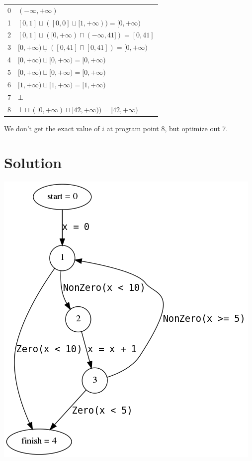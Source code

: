 \documentclass[a4paper]{article}
\def\lub{\sqcup}
\def\xlub{\underline\lub}
\def\glb{\sqcap}
\begin{document}
\begin{tabular}{|c|l|}
\hline
0 & $ (-\infty, +\infty) $                                                          \\
1 & $ [0, 1] \lub ([0, 0] \lub [1, +\infty)) = [0, +\infty) $                       \\
2 & $ [0, 1] \lub ([0, +\infty) \glb (-\infty, 41]) = [0, 41] $                     \\
3 & $ [0, +\infty) \xlub ([0, 41] \glb [0, 41]) = [0, +\infty) $                    \\
4 & $ [0, +\infty) \lub [0, +\infty) = [0, +\infty) $                               \\
5 & $ [0, +\infty) \lub [0, +\infty) = [0, +\infty) $                               \\
6 & $ [1, +\infty) \lub [1, +\infty) = [1, +\infty) $                               \\
7 & $ \bot $                                                                        \\
8 & $ \bot \lub ([0, +\infty) \glb [42, +\infty)) = [42, +\infty) $                 \\
\hline

\end{tabular}

We don't get the exact value of $ i $ at program point $ 8 $, but optimize out $ 7 $.

\section{Solution}

\includegraphics[scale=0.3]{5-2.png}
\end{document}
